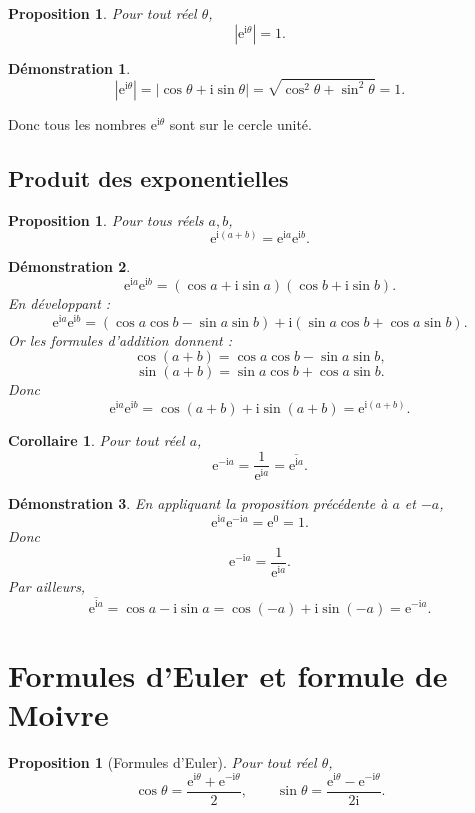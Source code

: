 \documentclass[11pt,a4paper]{article}
\newtheorem{proposition}[definition]{Proposition}
\newtheorem{corollaire}[definition]{Corollaire}
\newtheorem*{demonstration}{Démonstration}
\newcommand{\ii}{\mathrm{i}}
\newcommand{\e}{\mathrm{e}}
\begin{document}
\begin{proposition}
Pour tout réel $\theta$,
\[
\left|\e^{\ii\theta}\right|=1.
\]
\end{proposition}

\begin{demonstration}
\[
\left|\e^{\ii\theta}\right|
=|\cos\theta+\ii\sin\theta|
=\sqrt{\cos^2\theta+\sin^2\theta}
=1.
\]
\end{demonstration}

Donc tous les nombres $\e^{\ii\theta}$ sont sur le cercle unité.

\subsection{Produit des exponentielles}

\begin{proposition}
Pour tous réels $a,b$,
\[
\e^{\ii(a+b)}=\e^{\ii a}\e^{\ii b}.
\]
\end{proposition}

\begin{demonstration}
\[
\e^{\ii a}\e^{\ii b}
=(\cos a+\ii\sin a)(\cos b+\ii\sin b).
\]
En développant :
\[
\e^{\ii a}\e^{\ii b}
=(\cos a\cos b-\sin a\sin b)+\ii(\sin a\cos b+\cos a\sin b).
\]
Or les formules d'addition donnent :
\[
\cos(a+b)=\cos a\cos b-\sin a\sin b,
\]
\[
\sin(a+b)=\sin a\cos b+\cos a\sin b.
\]
Donc
\[
\e^{\ii a}\e^{\ii b}
=\cos(a+b)+\ii\sin(a+b)
=\e^{\ii(a+b)}.
\]
\end{demonstration}

\begin{corollaire}
Pour tout réel $a$,
\[
\e^{-\ii a}=\frac{1}{\e^{\ii a}}=\overline{\e^{\ii a}}.
\]
\end{corollaire}

\begin{demonstration}
En appliquant la proposition précédente à $a$ et $-a$,
\[
\e^{\ii a}\e^{-\ii a}=\e^0=1.
\]
Donc
\[
\e^{-\ii a}=\frac1{\e^{\ii a}}.
\]
Par ailleurs,
\[
\overline{\e^{\ii a}}=\cos a-\ii\sin a=\cos(-a)+\ii\sin(-a)=\e^{-\ii a}.
\]
\end{demonstration}

\section{Formules d'Euler et formule de Moivre}

\begin{proposition}[Formules d'Euler]
Pour tout réel $\theta$,
\[
\cos\theta=\frac{\e^{\ii\theta}+\e^{-\ii\theta}}{2},
\qquad
\sin\theta=\frac{\e^{\ii\theta}-\e^{-\ii\theta}}{2\ii}.
\]
\end{proposition}
\end{document}
